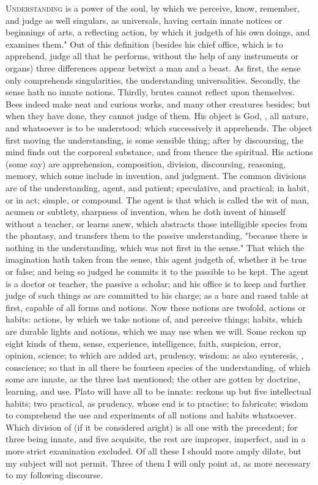 \lettrine[ante={\large{}"}]{U}{nderstanding} is a power of the soul,
by which we perceive, know, remember, and judge as well
singulars, as universals, having certain innate notices or beginnings of arts,
a reflecting action, by which it judgeth of his own doings, and examines them."
Out of this definition (besides his chief office, which is to apprehend, judge
all that he performs, without the help of any instruments or organs) three
differences appear betwixt a man and a beast. As first, the sense only
comprehends singularities, the understanding universalities. Secondly, the
sense hath no innate notions. Thirdly, brutes cannot reflect upon themselves.
Bees indeed make neat and curious works, and many other creatures besides; but
when they have done, they cannot judge of them. His object is God,
, all nature, and whatsoever is to be understood: which
successively it apprehends. The object first moving the understanding, is some
sensible thing; after by discoursing, the mind finds out the corporeal
substance, and from thence the spiritual. His actions (some say) are
apprehension, composition, division, discoursing, reasoning, memory, which some
include in invention, and judgment. The common divisions are of the
understanding, agent, and patient; speculative, and practical; in habit, or in
act; simple, or compound. The agent is that which is called the wit of man,
acumen or subtlety, sharpness of invention, when he doth invent of himself
without a teacher, or learns anew, which abstracts those intelligible species
from the phantasy, and transfers them to the passive understanding,
"because there is nothing in the understanding, which was
not first in the sense." That which the imagination hath taken from the sense,
this agent judgeth of, whether it be true or false; and being so judged he
commits it to the passible to be kept. The agent is a doctor or teacher, the
passive a scholar; and his office is to keep and further judge of such things
as are committed to his charge; as a bare and rased table at first, capable of
all forms and notions. Now these notions are twofold, actions or habits:
actions, by which we take notions of, and perceive things; habits, which are
durable lights and notions, which we may use when we will. Some reckon up eight
kinds of them, sense, experience, intelligence, faith, suspicion, error,
opinion, science; to which are added art, prudency, wisdom: as also
synteresis, , conscience; so that in
all there be fourteen species of the understanding, of which some are innate,
as the three last mentioned; the other are gotten by doctrine, learning, and
use. Plato will have all to be innate: \Aristotle{} reckons up but five
intellectual habits; two practical, as prudency, whose end is to practise; to
fabricate; wisdom to comprehend the use and experiments of all notions and
habits whatsoever. Which division of \Aristotle{} (if it be considered aright) is
all one with the precedent; for three being innate, and five acquisite, the
rest are improper, imperfect, and in a more strict examination excluded. Of all
these I should more amply dilate, but my subject will not permit. Three of them
I will only point at, as more necessary to my following discourse.

